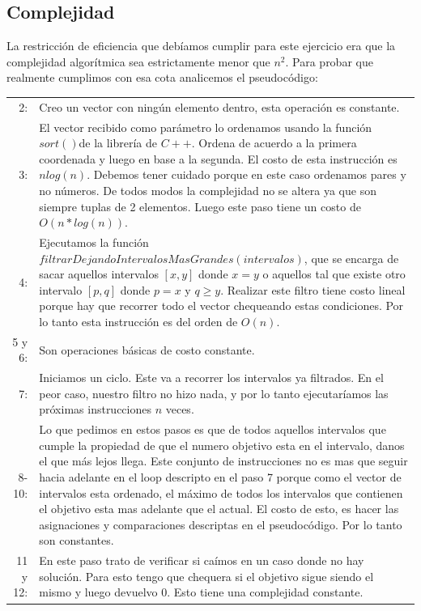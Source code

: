 \documentclass[a4paper, 10pt]{article}
\begin{document}
\subsection{Complejidad}

La restricción de eficiencia que debíamos cumplir para este ejercicio era que la complejidad algorítmica sea estrictamente menor que $n^2$. Para probar que realmente cumplimos con esa cota analicemos el pseudocódigo:

\begin{tabular}{rp{15.8cm}}
2:& Creo un vector con ningún elemento dentro, esta operación es constante.\\
3:& El vector recibido como parámetro lo ordenamos usando la función $sort()$\footnotemark de la librería de $C++$. Ordena de acuerdo a la primera coordenada y luego en base a la segunda. El costo de esta instrucción es $n log(n)$. Debemos tener cuidado porque en este caso ordenamos pares y no números. De todos modos la complejidad no se altera ya que son siempre tuplas de 2 elementos. Luego este paso tiene un costo de $O(n * log(n))$.\\
4:& Ejecutamos la función $filtrarDejandoIntervalosMasGrandes(intervalos)$, que se encarga de sacar aquellos intervalos
$[x,y]$ donde $x = y$ o aquellos tal que existe otro intervalo $[p,q]$ donde $p = x$ y $q \geq y$. Realizar este filtro tiene
costo lineal porque hay que recorrer todo el vector chequeando estas condiciones. Por lo tanto esta instrucción es del orden de $O(n)$.\\
5 y 6:& Son operaciones básicas de costo constante.\\
7:& Iniciamos un ciclo. Este va a recorrer los intervalos ya filtrados. En el peor caso, nuestro filtro no hizo nada, y por lo tanto ejecutaríamos las próximas instrucciones $n$ veces.\\
8-10:& Lo que pedimos en estos pasos es que de todos aquellos intervalos que cumple la propiedad de que el numero objetivo esta en el intervalo, danos el que más lejos llega. Este conjunto de instrucciones no es mas que seguir hacia adelante en el loop descripto en el paso 7 porque como el vector de intervalos esta ordenado, el máximo de todos los intervalos que contienen el objetivo esta mas adelante que el actual. El costo de esto, es hacer las asignaciones y comparaciones descriptas en el pseudocódigo. Por lo tanto son constantes.\\
11 y 12:& En este paso trato de verificar si caímos en un caso donde no hay solución. Para esto tengo que chequera si el objetivo sigue siendo el mismo y luego devuelvo $0$. Esto tiene una complejidad constante.\\

\end{tabular}
\end{document}
